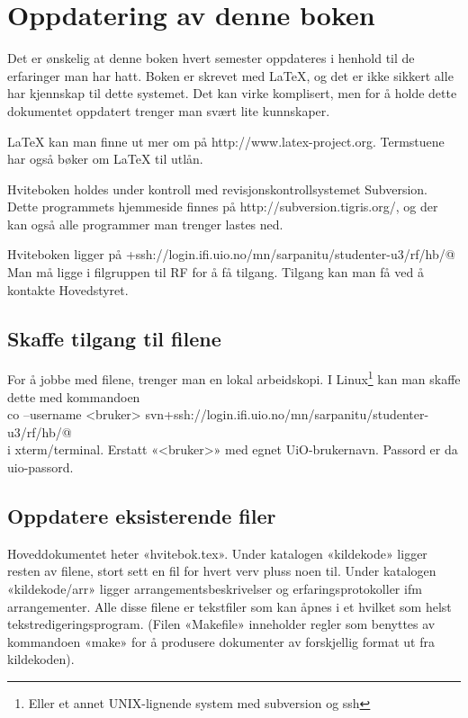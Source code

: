 \documentclass[11pt,norsk,a4paper,pointlessnumbers]{scrbook}
\begin{document}
\appendix

\chapter{Oppdatering av denne boken}
Det er ønskelig at denne boken hvert semester oppdateres i henhold til
de erfaringer man har hatt. Boken er skrevet med \LaTeX, og det er ikke
sikkert alle har kjennskap til dette systemet. Det kan virke komplisert,
men for å holde dette dokumentet oppdatert trenger man svært lite
kunnskaper.

\LaTeX{} kan man finne ut mer om på http://www.latex-project.org. Termstuene
har også bøker om \LaTeX{} til utlån.

Hviteboken holdes under kontroll med revisjonskontrollsystemet Subversion.
Dette programmets hjemmeside finnes på http://subversion.tigris.org/, og
der kan også alle programmer man trenger lastes ned.

Hviteboken ligger på \verb@svn+ssh://login.ifi.uio.no/mn/sarpanitu/studenter-u3/rf/hb/@
Man må ligge i filgruppen til RF for å få tilgang. Tilgang kan man få ved å 
kontakte Hovedstyret.

\section{Skaffe tilgang til filene}
For å jobbe med filene, trenger man en lokal arbeidskopi. I Linux\footnote{Eller et annet UNIX-lignende system med subversion og ssh} kan man
skaffe dette med kommandoen\\
\verb@svn co --username <bruker> svn+ssh://login.ifi.uio.no/mn/sarpanitu/studenter-u3/rf/hb/@\\
i xterm/terminal. Erstatt «<bruker>» med egnet UiO-brukernavn. Passord er da uio-passord.

\section{Oppdatere eksisterende filer}
Hoveddokumentet heter «hvitebok.tex». Under katalogen «kildekode» ligger
resten av filene, stort sett en fil for hvert verv pluss noen til.
Under katalogen «kildekode/arr» ligger arrangementsbeskrivelser og
erfaringsprotokoller ifm arrangementer. Alle disse filene er tekstfiler
som kan åpnes i et hvilket som helst tekstredigeringsprogram.
(Filen «Makefile» inneholder regler som benyttes av kommandoen «make»
for å produsere dokumenter av forskjellig format ut fra kildekoden).
\end{document}
